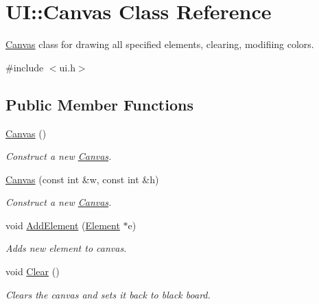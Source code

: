 \hypertarget{classUI_1_1Canvas}{}\section{UI\+:\+:Canvas Class Reference}
\label{classUI_1_1Canvas}


\hyperlink{classUI_1_1Canvas}{Canvas} class for drawing all specified elements, clearing, modifiing colors.  




{\ttfamily \#include $<$ui.\+h$>$}

\subsection*{Public Member Functions}
\begin{DoxyCompactItemize}
\item 
\mbox{\label{classUI_1_1Canvas_a4ec2952158236b1c5a188e591052ee56}} 
\hyperlink{classUI_1_1Canvas_a4ec2952158236b1c5a188e591052ee56}{Canvas} ()
\begin{DoxyCompactList}\small\item\em Construct a new \hyperlink{classUI_1_1Canvas}{Canvas}. \end{DoxyCompactList}\item 
\hyperlink{classUI_1_1Canvas_a4defdb530bdaecfa571244727688811b}{Canvas} (const int \&w, const int \&h)
\begin{DoxyCompactList}\small\item\em Construct a new \hyperlink{classUI_1_1Canvas}{Canvas}. \end{DoxyCompactList}\item 
void \hyperlink{classUI_1_1Canvas_ad81e6b6a2c382a65c730ad16fc90a02b}{Add\+Element} (\hyperlink{classUI_1_1Element}{Element} $\ast$e)
\begin{DoxyCompactList}\small\item\em Adds new element to canvas. \end{DoxyCompactList}\item 
\mbox{\label{classUI_1_1Canvas_aae0e18e7552ae547cbb95cb134529759}} 
void \hyperlink{classUI_1_1Canvas_aae0e18e7552ae547cbb95cb134529759}{Clear} ()
\begin{DoxyCompactList}\small\item\em Clears the canvas and sets it back to black board. \end{DoxyCompactList}\item 

\end{DoxyCompactItemize}
